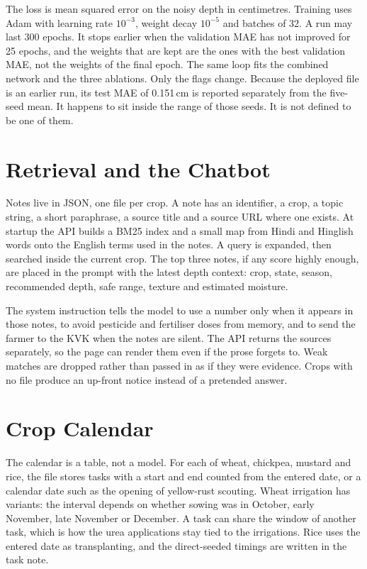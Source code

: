 The loss is mean squared error on the noisy depth in centimetres. Training uses Adam with learning rate $10^{-3}$, weight decay $10^{-5}$ and batches of 32. A run may last 300 epochs. It stops earlier when the validation MAE has not improved for 25 epochs, and the weights that are kept are the ones with the best validation MAE, not the weights of the final epoch. The same loop fits the combined network and the three ablations. Only the flags change. Because the deployed file is an earlier run, its test MAE of 0.151\,cm is reported separately from the five-seed mean. It happens to sit inside the range of those seeds. It is not defined to be one of them.

\section{Retrieval and the Chatbot}
Notes live in JSON, one file per crop. A note has an identifier, a crop, a topic string, a short paraphrase, a source title and a source URL where one exists. At startup the API builds a BM25 index and a small map from Hindi and Hinglish words onto the English terms used in the notes. A query is expanded, then searched inside the current crop. The top three notes, if any score highly enough, are placed in the prompt with the latest depth context: crop, state, season, recommended depth, safe range, texture and estimated moisture.

The system instruction tells the model to use a number only when it appears in those notes, to avoid pesticide and fertiliser doses from memory, and to send the farmer to the KVK when the notes are silent. The API returns the sources separately, so the page can render them even if the prose forgets to. Weak matches are dropped rather than passed in as if they were evidence. Crops with no file produce an up-front notice instead of a pretended answer.

\section{Crop Calendar}
The calendar is a table, not a model. For each of wheat, chickpea, mustard and rice, the file  stores tasks with a start and end counted from the entered date, or a calendar date such as the opening of yellow-rust scouting. Wheat irrigation has variants: the interval depends on whether sowing was in October, early November, late November or December. A task can share the window of another task, which is how the urea applications stay tied to the irrigations. Rice uses the entered date as transplanting, and the direct-seeded timings are written in the task note.

